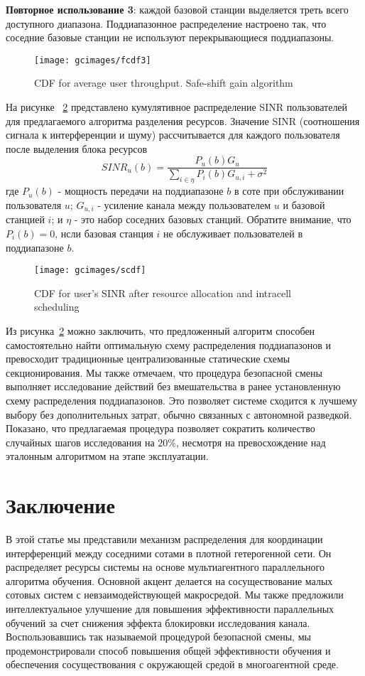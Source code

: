 \textbf{Повторное использование 3}: каждой базовой станции выделяется треть всего доступного диапазона. Поддиапазонное распределение настроено так, что соседние базовые станции не используют перекрывающиеся поддиапазоны.

\begin{figure}
    \centering
    \texttt{[image: gcimages/fcdf3]}
    \caption{CDF for average user throughput. Safe-shift gain algorithm}
    \label{fig:fcdf3}
\end{figure}

На рисунке ~\ref{fig:scdf} представлено кумулятивное распределение SINR пользователей для предлагаемого алгоритма разделения ресурсов. Значение SINR (соотношения сигнала к интерференции и шуму) рассчитывается для каждого пользователя после выделения блока ресурсов
\begin{equation}
    \label{eq:SINR}
    {SINR}_u(b) = \frac{P_u(b) G_u}{\sum_{i \in \eta} P_i(b) G_{u,i} + \sigma^2}
\end{equation}
где $P_u(b)$ - мощность передачи на поддиапазоне $b$ в соте при обслуживании пользователя $u$; $G_{u,i}$ - усиление канала между пользователем $u$ и базовой станцией $i$; и $\eta$ - это набор соседних базовых станций. Обратите внимание, что $P_i(b) = 0$, нсли базовая станция $i$ не обслуживает пользователей в поддиапазоне $b$.

\begin{figure}
    \centering
    \texttt{[image: gcimages/scdf]}
    \caption{CDF for user's SINR after resource allocation and intracell scheduling}
    \label{fig:scdf}
\end{figure}

Из рисунка~\ref{fig:scdf} можно заключить, что предложенный алгоритм способен самостоятельно найти оптимальную схему распределения поддиапазонов и превосходит традиционные централизованные статические схемы секционирования. Мы также отмечаем, что процедура безопасной смены выполняет исследование действий без вмешательства в ранее установленную схему распределения поддиапазонов. Это позволяет системе сходится к лучшему выбору без дополнительных затрат, обычно связанных с автономной разведкой. Показано, что предлагаемая процедура позволяет сократить количество случайных шагов исследования на $20\%$, несмотря на превосхождение над эталонным алгоритмом на этапе эксплуатации.

\section{Заключение}
В этой статье мы представили механизм распределения для координации интерференций между соседними сотами в плотной гетерогенной сети. Он распределяет ресурсы системы на основе мультиагентного параллельного алгоритма обучения. Основной акцент делается на сосуществование малых сотовых систем с невзаимодействующей макросредой. Мы также предложили интеллектуальное улучшение для повышения эффективности параллельных обучений за счет снижения эффекта блокировки исследования канала. Воспользовавшись так называемой процедурой безопасной смены, мы продемонстрировали способ повышения общей эффективности обучения и обеспечения сосуществования с окружающей средой в многоагентной среде.

